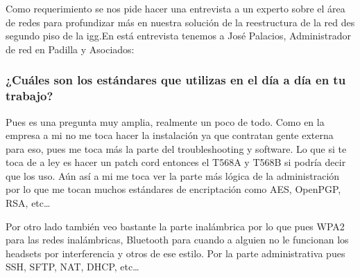 \documentclass[../main.tex]{subfiles}
\begin{document}

Como requerimiento se nos pide hacer una entrevista a un experto sobre
el área de redes para profundizar más en nuestra solución de la reestructura
de la red des segundo piso de la \acrshort{igg}.\@ En está entrevista tenemos a
José Palacios, Administrador de red en Padilla y Asociados:


\subsubsection*{¿Cuáles son los estándares que utilizas en el día a día en tu trabajo?}

Pues es una pregunta muy amplia, realmente un poco de todo. Como en la empresa a mi no me toca hacer la instalación ya que contratan gente externa para eso, pues me toca más la parte del troubleshooting y software. Lo que si te toca de a ley es hacer un patch cord entonces el T568A y T568B si podría decir que los uso. Aún así a mi me toca ver la parte más lógica de la administración por lo que me tocan muchos estándares de encriptación como AES, OpenPGP, RSA, etc\ldots

\medskip

Por otro lado también veo bastante la parte inalámbrica por lo que pues \gls{WPA}2 para las redes inalámbricas, Bluetooth para cuando a alguien no le funcionan los headsets por interferencia y otros de ese estilo. Por la parte administrativa pues SSH, SFTP, NAT, DHCP, etc\ldots
\end{document}
